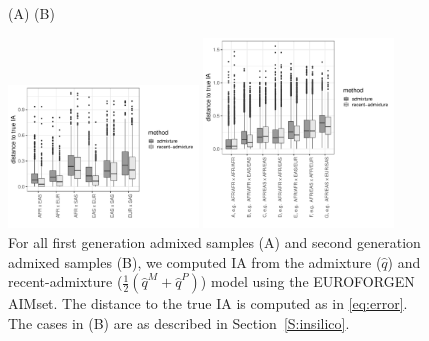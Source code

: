 \documentclass[12pt]{article}
\theoremstyle{definition}
\begin{document}
\begin{figure}[htb]
  \hspace{3cm} (A) \hspace{8cm} (B)
  \begin{center}
    \parbox[b]{0.45\textwidth}{\includegraphics[width=0.45\textwidth]{deviations_mixed_EUROFORGEN.pdf}\vspace{2cm}}
    \hspace{1cm}
    \parbox[b]{0.45\textwidth}{\includegraphics[width=0.45\textwidth]{deviations_mixed_cases_EUROFORGEN.pdf}}
  \end{center}
  \caption{\label{fig:mixed_cases_EUROFORGEN} For all first generation admixed samples (A) and second generation admixed samples (B), we computed IA from the admixture ($\hat q$) and recent-admixture ($\tfrac 12 (\hat q^M + \hat q^P)$) model using the EUROFORGEN AIMset. The distance to the true IA is computed as in \eqref{eq:error}. The cases in (B) are as described in Section~\ref{S:insilico}. }
\end{figure}
\end{document}
